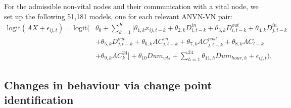 %
For the admissible non-vital nodes and their communication with a vital node, %
we set up the following 51,181 models, one for each relevant ANVN-VN pair: 
\begin{align} \label{eq:mod_fol}
	\text{logit}(AX+\epsilon_{ij,t}) = \text{logit} (&\theta_0 + \sum_{k=1}^K [ \theta_{1,k} x_{ij, t - k} 
	+ \theta_{2,k} D_{i, t - k}^{in} + \theta_{3,k} D_{i, t - k}^{out} + \theta_{4,k} D_{j, t - k}^{in} \nonumber \\ 
	& + \theta_{5,k} D_{j, t - k}^{out} 
	+ \theta_{6,k} AC_{j, t - k}^{vn} + \theta_{7,k} AC^{post}_{j,t-k} + \theta_{8,k} AC_{t - k} \\
	&  + \theta_{9,k} AC^{24}_{k} ]
	+ \theta_{10} Dum_{wls}+ \sum_{h=1}^{24} \theta_{11,h} Dum_{hour, h}   
	+ \epsilon_{ij,t} ). \nonumber
\end{align}


\subsection{Changes in behaviour via change point identification} \label{sec:cps}

